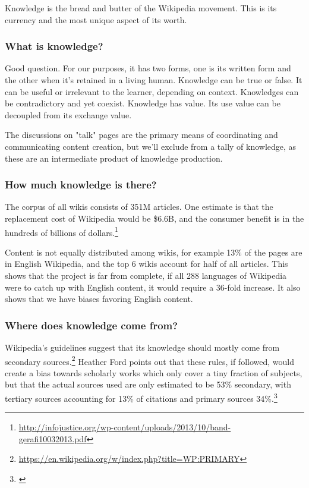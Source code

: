 \documentclass[format=sigconf, authorversion]{acmart}
\begin{document}
Knowledge is the bread and butter of the Wikipedia movement. This is its currency and the most unique aspect of its worth.

\subsubsection{What is knowledge?}

Good question.  For our purposes, it has two forms, one is its written form and the other when it's retained in a living human.  Knowledge can be true or false.  It can be useful or irrelevant to the learner, depending on context.  Knowledges can be contradictory and yet coexist.  Knowledge has value.  Its use value can be decoupled from its exchange value.

The discussions on "talk" pages are the primary means of coordinating and communicating content creation, but we'll exclude from a tally of knowledge, as these are an intermediate product of knowledge production.

\subsubsection{How much knowledge is there?}

The corpus of all wikis consists of 351M articles.  One estimate is that the replacement cost of Wikipedia would be \$6.6B, and the consumer benefit is in the hundreds of billions of dollars.\footnote{\url{http://infojustice.org/wp-content/uploads/2013/10/band-gerafi10032013.pdf}}

Content is not equally distributed among wikis, for example 13\% of the pages are in English Wikipedia, and the top 6 wikis account for half of all articles.  This shows that the project is far from complete, if all 288 languages of Wikipedia were to catch up with English content, it would require a 36-fold increase.  It also shows that we have biases favoring English content.

\subsubsection{Where does knowledge come from?}

Wikipedia's guidelines suggest that its knowledge should mostly come from secondary sources.\footnote{\url{https://en.wikipedia.org/w/index.php?title=WP:PRIMARY}}  Heather Ford points out that these rules, if followed, would create a bias towards scholarly works which only cover a tiny fraction of subjects, but that the actual sources used are only estimated to be 53\% secondary, with tertiary sources accounting for 13\% of citations and primary sources 34\%.\footnote{\citet{Ford2013}}
\end{document}
